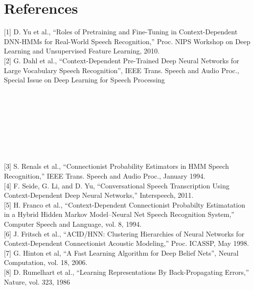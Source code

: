 \documentclass{article}
\begin{document}
\section*{References}

[1] D. Yu et al., “Roles of Pretraining and Fine-Tuning
in Context-Dependent DNN-HMMs for Real-World
Speech Recognition,” Proc. NIPS Workshop on Deep
Learning and Unsupervised Feature Learning, 2010.
\\ 

[2] G. Dahl et al., “Context-Dependent Pre-Trained Deep
Neural Networks for Large Vocabulary Speech Recognition”, IEEE Trans. Speech and Audio Proc., Special
Issue on Deep Learning for Speech Processing
 \\ \\ \\ \\ \\ \\ \\ \\ \\

[3] S. Renals et al., “Connectionist Probability Estimators in HMM Speech Recognition,” IEEE
Trans. Speech and Audio Proc., January 1994.
\\ 

[4] F. Seide, G. Li, and D. Yu, “Conversational Speech
Transcription Using Context-Dependent Deep Neural
Networks,” Interspeech, 2011.
\\

[5] H. Franco et al., “Context-Dependent Connectionist Probabilty Estimatation in a Hybrid Hidden
Markov Model–Neural Net Speech Recognition System,” Computer Speech and Language, vol. 8, 1994.
\\

[6] J. Fritsch et al., “ACID/HNN: Clustering Hierarchies
of Neural Networks for Context-Dependent Connectionist Acoustic Modeling,” Proc. ICASSP, May 1998.
\\

[7] G. Hinton et al, “A Fast Learning Algorithm for Deep
Belief Nets”, Neural Computation, vol. 18, 2006.
\\

[8] D. Rumelhart et al., “Learning Representations By
Back-Propagating Errors,” Nature, vol. 323, 1986


\end{document}
